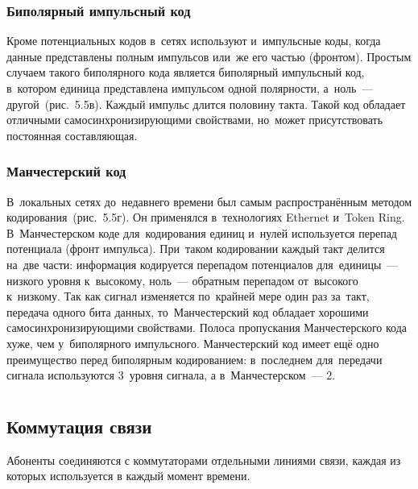 \documentclass[
	a4paper,
	oneside,
	BCOR = 10mm,
	DIV = 12,
	12pt,
	headings = normal,
]{scrartcl}
\begin{document}
				\subsubsection{Биполярный импульсный код}
					Кроме потенциальных кодов в~сетях используют и~импульсные коды, когда данные представлены полным импульсов или~же его частью (фронтом). Простым случаем такого биполярного кода является биполярный импульсный код, в~котором единица представлена импульсом одной полярности, а~ноль~— другой~(рис.~5.5в). Каждый импульс длится половину такта. Такой код обладает отличными самосинхронизирующими свойствами, но~может присутствовать постоянная составляющая.

				\subsubsection{Манчестерский код}
					В~локальных сетях до~недавнего времени был самым распространённым методом кодирования~(рис.~5.5г). Он применялся в~технологиях \textenglish{Ethernet} и~\textenglish{Token Ring}. В~Манчестерском коде для~кодирования единиц и~нулей используется перепад потенциала (фронт импульса). При~таком кодировании каждый такт делится на~две части: информация кодируется перепадом потенциалов для~единицы~— низкого уровня к~высокому, ноль~— обратным перепадом от~высокого к~низкому. Так как сигнал изменяется по~крайней мере один раз за~такт, передача одного бита данных, то~Манчестерский код обладает хорошими самосинхронизирующими свойствами. Полоса пропускания Манчестерского кода хуже, чем у~биполярного импульсного. Манчестерский код имеет ещё одно преимущество перед биполярным кодированием: в~последнем для~передачи сигнала используются 3~уровня сигнала, а в~Манчестерском~— 2.

			\section{}
				\subsection{Коммутация связи}
				Абоненты соединяются с коммутаторами отдельными линиями связи, каждая из которых используется в каждый момент времени.
\end{document}
